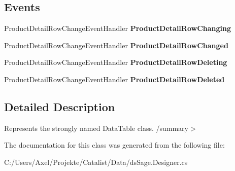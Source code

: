 \subsection*{Events}
\begin{DoxyCompactItemize}
\item 
Product\+Detail\+Row\+Change\+Event\+Handler {\bfseries Product\+Detail\+Row\+Changing}\hypertarget{class_products_1_1_data_1_1ds_sage_1_1_product_detail_data_table_a78252a4c9760a9aa3cf4df4d7bc7b8b1}{}\label{class_products_1_1_data_1_1ds_sage_1_1_product_detail_data_table_a78252a4c9760a9aa3cf4df4d7bc7b8b1}

\item 
Product\+Detail\+Row\+Change\+Event\+Handler {\bfseries Product\+Detail\+Row\+Changed}\hypertarget{class_products_1_1_data_1_1ds_sage_1_1_product_detail_data_table_af14f7f668294718e29d2e00535cd51b4}{}\label{class_products_1_1_data_1_1ds_sage_1_1_product_detail_data_table_af14f7f668294718e29d2e00535cd51b4}

\item 
Product\+Detail\+Row\+Change\+Event\+Handler {\bfseries Product\+Detail\+Row\+Deleting}\hypertarget{class_products_1_1_data_1_1ds_sage_1_1_product_detail_data_table_a1f7c45d3e4da059f9a8cb980e39ba346}{}\label{class_products_1_1_data_1_1ds_sage_1_1_product_detail_data_table_a1f7c45d3e4da059f9a8cb980e39ba346}

\item 
Product\+Detail\+Row\+Change\+Event\+Handler {\bfseries Product\+Detail\+Row\+Deleted}\hypertarget{class_products_1_1_data_1_1ds_sage_1_1_product_detail_data_table_afef6faac4c6d5a476fbf287a454f20d7}{}\label{class_products_1_1_data_1_1ds_sage_1_1_product_detail_data_table_afef6faac4c6d5a476fbf287a454f20d7}

\end{DoxyCompactItemize}


\subsection{Detailed Description}
Represents the strongly named Data\+Table class. /summary$>$ 

The documentation for this class was generated from the following file\+:\begin{DoxyCompactItemize}
\item 
C\+:/\+Users/\+Axel/\+Projekte/\+Catalist/\+Data/ds\+Sage.\+Designer.\+cs\end{DoxyCompactItemize}
